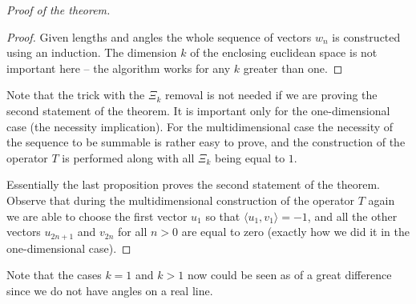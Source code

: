 \begin{proof}[Proof of the theorem]
\begin{proof}
            Given lengths and angles the whole sequence of vectors $w_n$ is constructed using an induction.
            The dimension $k$ of the enclosing euclidean space is not important here -- the algorithm works 
            for any $k$ greater than one.
        \end{proof}
        \begin{remark}
            Note that the trick with the $\Xi_k$ removal is not needed if we are proving the second statement of the theorem.
            It is important only for the one-dimensional case (the necessity implication).
            For the multidimensional case the necessity of
            the sequence to be summable is rather easy to prove, and the construction of the operator $T$ is
            performed along with all $\Xi_k$ being equal to $1$.
        \end{remark}
        Essentially the last proposition proves the second statement of the theorem.
        Observe that during the multidimensional construction of the operator $T$ again
        we are able to choose the first vector $u_1$ so that $\langle u_1,v_1 \rangle = -1$,
        and all the other vectors $u_{2n+1}$ and $v_{2n}$ for all $n>0$ are equal to zero (exactly how we did it in the 
        one-dimensional case).
    \end{proof}
    \begin{remark}
        Note that the cases $k=1$ and $k > 1$ now could be seen as of a great difference since we do not have angles
        on a real line.
    \end{remark}


